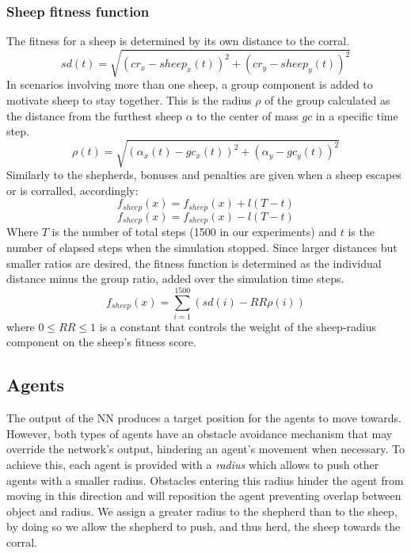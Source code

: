 \documentclass[conference]{IEEEtran}
\begin{document}
\subsubsection{Sheep fitness function}
The fitness for a sheep is determined by its own distance to the corral. 
\begin{equation} \label{eq:sheep_dist}
sd(t) = \sqrt{(cr_x - sheep_x(t))^2 + (cr_y - sheep_y(t))^2}
\end{equation}
In scenarios involving more than one sheep, a group component is added to motivate sheep to stay together. 
This is the radius $\rho$ of the group calculated as the distance from the furthest sheep $\alpha$ to the center of mass $gc$ in a specific time step. 
\begin{equation} \label{eq:sheep_ratio}
\rho(t) = \sqrt{(\alpha_x(t) - gc_x(t))^2 + (\alpha_y - gc_y(t))^2}
\end{equation}
Similarly to the shepherds, bonuses and penalties are given when a sheep escapes or is corralled, accordingly:
\begin{equation} \label{eq:sheep_bonus}
f_{sheep}(x) = f_{sheep}(x) + l (T - t)
\end{equation}
\begin{equation} \label{eq:sheep_pen}
f_{sheep}(x) = f_{sheep}(x) - l (T - t)
\end{equation}
Where $T$ is the number of total steps (1500 in our experiments) and $t$ is the number of elapsed steps when the simulation stopped.
Since larger distances but smaller ratios are desired, the fitness function is determined as the individual distance minus the group ratio, added over the simulation time steps. 
\begin{equation} \label{eq:sheep_fitness}
f_{sheep}(x) = \sum_{i=1}^{1500}(sd(i) - {RR} \rho(i))
\end{equation}
where $0 \leq RR \leq 1$ is a constant that controls the weight of the sheep-radius component on the sheep's fitness score.


\subsection{Agents}
\label{sec:agents_design}
The output of the NN produces a target position for the agents to move towards.
However, both types of agents have an obstacle avoidance mechanism that may override the network's output, hindering an agent's movement when necessary.
To achieve this, each agent is provided with a \textit{radius} which allows to push other agents with a smaller radius.
Obstacles entering this radius hinder the agent from moving in this direction and will reposition the agent preventing overlap between object and radius.
We assign a greater radius to the shepherd than to the sheep, by doing so we allow the shepherd to push, and thus herd, the sheep towards the corral.
\end{document}
